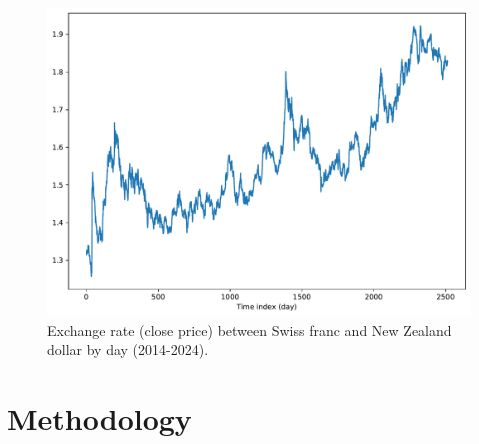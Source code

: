 \documentclass[aps,prb,groupedaddress,twocolumn,showpacs,dvipdfmx,superscriptaddress,pdftex]{revtex4-2}
\begin{document}
\begin{figure}[h]
    \centering
    \includegraphics[width=\linewidth]{img/CHF_NZD.pdf}
    \caption{Exchange rate (close price) between Swiss franc and New Zealand dollar by day (2014-2024).}
    \label{fig:fx}
\end{figure}

\section{Methodology}
\label{sec.method}

\end{document}
